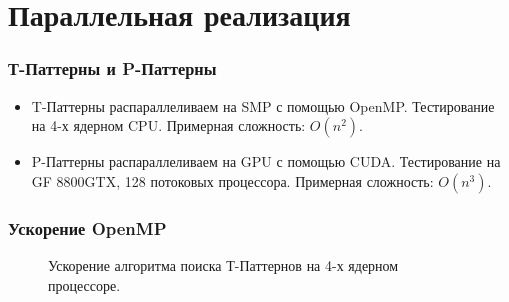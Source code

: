 \documentclass[smaller]{beamer}
\begin{document}
\section{Параллельная реализация}
\begin{frame}
  \frametitle{Т-Паттерны и P-Паттерны}
  \begin{itemize}
   \item T-Паттерны распараллеливаем на SMP с помощью OpenMP. Тестирование на 4-х ядерном CPU. Примерная сложность: $O(n^2)$.
  \item P-Паттерны распараллеливаем на GPU с помощью CUDA. Тестирование на GF 8800GTX, 128 потоковых процессора. Примерная сложность: $O(n^3)$.
  \end{itemize}
\end{frame}

\begin{frame}
 \frametitle{Ускорение OpenMP}
\begin{figure}[H]
	\caption{Ускорение алгоритма поиска Т-Паттернов на 4-х ядерном процессоре.}
\end{figure}
    
\end{frame}
\end{document}

